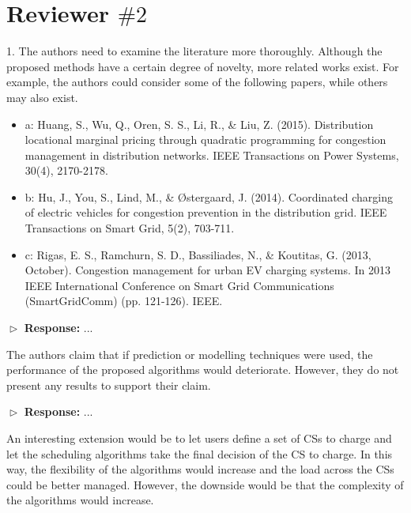 \documentclass[11pt]{article}
\begin{document}
\newpage
\section{Reviewer $\# 2$}

\vspace{3mm}
{\color{blue} 1.      The authors need to examine the literature more thoroughly. Although the proposed methods have a certain degree of novelty, more related works exist. For example, the authors could consider some of the following papers, while others may also exist.

\begin{itemize}
\item a: Huang, S., Wu, Q., Oren, S. S., Li, R., \& Liu, Z. (2015). Distribution locational marginal pricing through quadratic programming for congestion management in distribution networks. IEEE Transactions on Power Systems, 30(4), 2170-2178.

\item b: Hu, J., You, S., Lind, M., \& Østergaard, J. (2014). Coordinated charging of electric vehicles for congestion prevention in the distribution grid. IEEE Transactions on Smart Grid, 5(2), 703-711.

\item c: Rigas, E. S., Ramchurn, S. D., Bassiliades, N., \& Koutitas, G. (2013, October). Congestion management for urban EV charging systems. In 2013 IEEE International Conference on Smart Grid Communications (SmartGridComm) (pp. 121-126). IEEE.

\end{itemize}
}
\vspace{3mm}

$\vartriangleright$ \noindent\textbf{Response:} 
...

\vspace{3mm}
{\color{blue} The authors claim that if prediction or modelling techniques were used, the performance of the proposed algorithms would deteriorate. However, they do not present any results to support their claim.  }
\vspace{3mm}

$\vartriangleright$ \noindent\textbf{Response:} 
...

\vspace{3mm}
{\color{blue} An interesting extension would be to let users define a set of CSs to charge and let the scheduling algorithms take the final decision of the CS to charge. In this way, the flexibility of the algorithms would increase and the load across the CSs could be better managed. However, the downside would be that the complexity of the algorithms would increase. }
\vspace{3mm}
\end{document}
